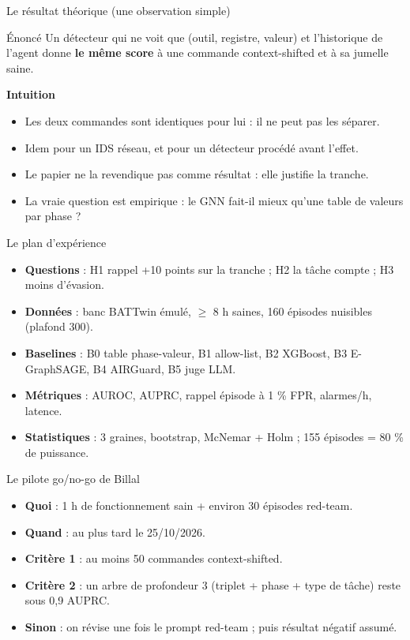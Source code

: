 \documentclass[aspectratio=169,11pt]{beamer}
\begin{document}
\begin{frame}{Le résultat théorique (une observation simple)}
\begin{block}{Énoncé}
Un détecteur qui ne voit que (outil, registre, valeur) et l'historique de l'agent donne \textbf{le même score} à une commande context-shifted et à sa jumelle saine.
\end{block}
\textbf{Intuition}
\begin{itemize}
\item Les deux commandes sont identiques pour lui : il ne peut pas les séparer.
\item Idem pour un IDS réseau, et pour un détecteur procédé avant l'effet.
\item Le papier ne la revendique pas comme résultat : elle justifie la tranche.
\item La vraie question est empirique : le GNN fait-il mieux qu'une table de valeurs par phase ?
\end{itemize}
\end{frame}

\begin{frame}{Le plan d'expérience}
\begin{itemize}
\item \textbf{Questions} : H1 rappel +10 points sur la tranche ; H2 la tâche compte ; H3 moins d'évasion.
\item \textbf{Données} : banc BATTwin émulé, $\geq$ 8 h saines, 160 épisodes nuisibles (plafond 300).
\item \textbf{Baselines} : B0 table phase-valeur, B1 allow-list, B2 XGBoost, B3 E-GraphSAGE, B4 AIRGuard, B5 juge LLM.
\item \textbf{Métriques} : AUROC, AUPRC, rappel épisode à 1 \% FPR, alarmes/h, latence.
\item \textbf{Statistiques} : 3 graines, bootstrap, McNemar + Holm ; 155 épisodes = 80 \% de puissance.
\end{itemize}
\end{frame}

\begin{frame}{Le pilote go/no-go de Billal}
\begin{itemize}
\item \textbf{Quoi} : 1 h de fonctionnement sain + environ 30 épisodes red-team.
\item \textbf{Quand} : au plus tard le 25/10/2026.
\item \textbf{Critère 1} : au moins 50 commandes context-shifted.
\item \textbf{Critère 2} : un arbre de profondeur 3 (triplet + phase + type de tâche) reste sous 0,9 AUPRC.
\item \textbf{Sinon} : on révise une fois le prompt red-team ; puis résultat négatif assumé.
\end{itemize}
\end{frame}
\end{document}
